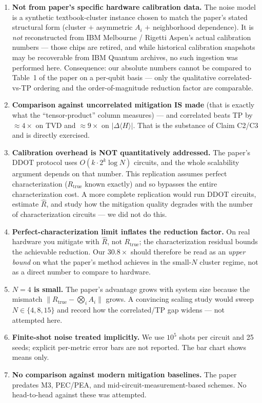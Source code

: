 \documentclass[11pt]{article}
\begin{document}
\begin{enumerate}
  \item \textbf{Not from paper's specific hardware calibration data.} The noise model
    is a synthetic textbook-cluster instance chosen to match the paper's stated
    structural form (cluster $+$ asymmetric $A_i$ $+$ neighborhood dependence).
    It is \emph{not} reconstructed from IBM Melbourne / Rigetti Aspen's actual
    calibration numbers --- those chips are retired, and while historical
    calibration snapshots may be recoverable from IBM Quantum archives, no such
    ingestion was performed here. Consequence: our absolute numbers cannot be
    compared to Table~1 of the paper on a per-qubit basis --- only the
    qualitative correlated-vs-TP ordering and the order-of-magnitude reduction
    factor are comparable.
  \item \textbf{Comparison against uncorrelated mitigation IS made} (that is
    exactly what the ``tensor-product'' column measures) --- and correlated
    beats TP by $\approx 4\times$ on TVD and $\approx 9\times$ on
    $|\Delta\langle H\rangle|$. That is the substance of Claim C2/C3 and is
    directly exercised.
  \item \textbf{Calibration overhead is NOT quantitatively addressed.} The
    paper's DDOT protocol uses $O(k\cdot 2^k \log N)$ circuits, and the whole
    scalability argument depends on that number. This replication assumes
    perfect characterization ($R_\text{true}$ known exactly) and so bypasses the
    entire characterization cost. A more complete replication would run DDOT
    circuits, estimate $\hat R$, and study how the mitigation quality degrades
    with the number of characterization circuits --- we did not do this.
  \item \textbf{Perfect-characterization limit inflates the reduction factor.}
    On real hardware you mitigate with $\hat R$, not $R_\text{true}$; the
    characterization residual bounds the achievable reduction. Our $30.8\times$
    should therefore be read as an \emph{upper bound} on what the paper's
    method achieves in the small-$N$ cluster regime, not as a direct number
    to compare to hardware.
  \item \textbf{$N=4$ is small.} The paper's advantage grows with system size
    because the mismatch $\|R_\text{true} - \bigotimes_i A_i\|$ grows.
    A convincing scaling study would sweep $N\in\{4,8,15\}$ and record how
    the correlated/TP gap widens --- not attempted here.
  \item \textbf{Finite-shot noise treated implicitly.} We use $10^5$ shots per
    circuit and 25 seeds; explicit per-metric error bars are not reported.
    The bar chart shows means only.
  \item \textbf{No comparison against modern mitigation baselines.} The paper
    predates M3, PEC/PEA, and mid-circuit-measurement-based schemes. No
    head-to-head against these was attempted.
\end{enumerate}
\end{document}

